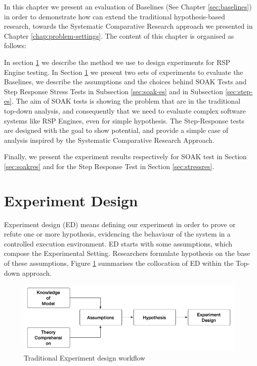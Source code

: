 In this chapter we present an evaluation of \name Baselines (See Chapter \ref{sec:baselines}) in order to demonstrate how \name can extend the traditional hypothesis-based research, towards the Systematic Comparative Research approach we presented in Chapter \ref{chap:problem-settings}. The content of this chapter is organised as follows:

In section \ref{sec:experiment-design} we describe the method we use to design experiments for RSP Engine testing. In Section \ref{sec:experiment-design} we present two sets of experiments to evaluate the Baselines, we describe the assumptions and the choices behind SOAK Tests and Step Response Stress Tests in Subsection \ref{sec:soak-es} and in Subsection \ref{sec:step-es}. The aim of SOAK tests is showing the problem that are in the traditional top-down analysis, and consequently that we need \name to evaluate complex software systems like RSP Engines, even for simple hypothesis.  The Step-Response tests are designed with the goal to show \name potential, and provide a simple case of analysis inspired by the Systematic Comparative Research Approach.

Finally, we present the experiment results respectively for SOAK test in Section \ref{sec:soakres} and for the Step Response Test in Section \ref{sec:stressres}.



\section{Experiment Design}\label{sec:experiment-design}

Experiment design (ED) means defining our experiment in order to prove or refute one or more hypothesis, evidencing the behaviour of the system in a controlled execution environment. ED starts with some assumptions, which compose the  Experimental Setting. Researchers formulate hypothesis on the base of these assumptions, Figure \ref{fig:experiment-design} summarises the collocation of ED within the Top-down approach.

\begin{figure}[tbh]
  \centering
	\includegraphics[width=\linewidth]{images/experiment-design}
	\caption{Traditional Experiment design workflow} 
  	\label{fig:experiment-design}
\end{figure}

